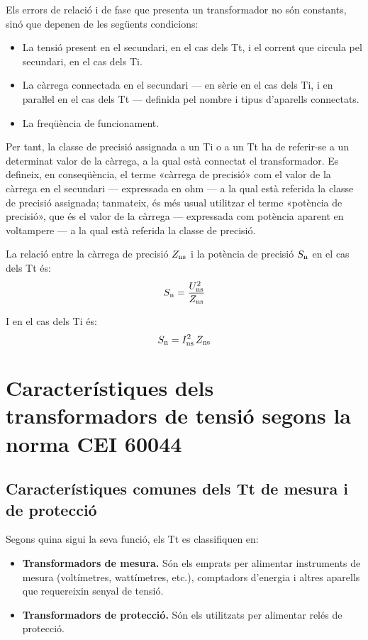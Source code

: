 Els errors de relació i de fase que presenta un transformador no són
constants, sinó que depenen de les següents condicions:
\begin{itemize}
   \item La tensió present en el secundari, en el cas dels Tt, i el corrent que
   circula    pel secundari, en el cas dels Ti.
   \item La càrrega connectada en el secundari --- en sèrie en el cas dels Ti,
   i en paraŀlel en el cas dels Tt --- definida pel nombre i tipus d'aparells connectats.
   \item La freqüència de funcionament.
\end{itemize}

Per tant, la classe de precisió assignada a un Ti o a un Tt ha de
referir-se a un determinat valor de la càrrega, a la qual està
connectat el transformador. Es defineix, en conseqüència, el terme
«càrrega de precisió» com el valor de la càrrega en el secundari
--- expressada en ohm --- a la qual està referida la classe de precisió
assignada; tanmateix, és més usual  utilitzar el terme «potència
de precisió», que és el valor de la càrrega --- expressada com potència aparent en voltampere ---
 a la qual està referida la classe de precisió.

La relació entre la càrrega de precisió $Z_\mathrm{ns}$ i la potència de
precisió $S_\mathrm{n}$ en el cas dels Tt és:
\begin{equation}
    S_\mathrm{n} = \frac{U_\mathrm{ns}^2}{Z_\mathrm{ns}}
\end{equation}

I en el cas dels Ti és:
\begin{equation}\label{eq:sn_ti}
    S_\mathrm{n} = I_\mathrm{ns}^2 \,Z_\mathrm{ns}
\end{equation}


\section{Característiques dels transformadors de tensió segons la norma CEI 60044}

\subsection{Característiques comunes dels Tt de mesura i de protecció}

Segons quina sigui la seva funció, els Tt es classifiquen en:
\begin{itemize}
	\item \textbf{Transformadors de mesura.} Són els emprats per alimentar
	instruments de mesura (voltímetres, wattímetres, etc.),         comptadors d'energia i altres aparells que requereixin senyal de tensió.
	\item \textbf{Transformadors de protecció.}  Són els utilitzats per
	alimentar relés de protecció.
\end{itemize}


